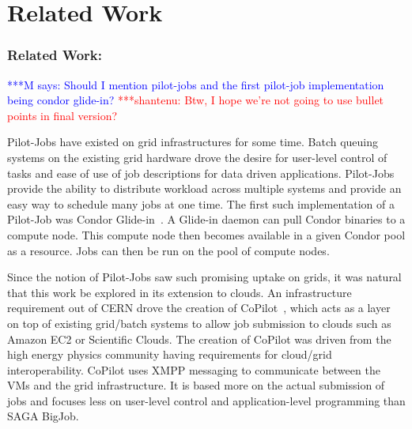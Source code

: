 \documentclass[times]{cpeauth}
\newcommand{\jhanote}[1]{ {\textcolor{red} { ***shantenu: #1 }}}
\newcommand{\mrnote}[1]{ {\textcolor{blue} { ***M says: #1 }}}
\newcommand{\pmnote}[1]{ {\textcolor{blue} { ***Pradeep: #1 }}}
\newcommand{\note}[1]{ {\textcolor{magenta} { ***Note: #1 }}}
\newcommand{\mrnote}[1]{}
\newcommand{\pmnote}[1]{}
\newcommand{\jhanote}[1]{}
\newcommand{\note}[1]{}
\newcommand{\pilotjob}{Pilot-Job\xspace}
\newcommand{\pilotjobs}{Pilot-Jobs\xspace}
\begin{document}






\section{Related Work}


\subsubsection*{Related Work:} 


\mrnote{Should I mention pilot-jobs and the first pilot-job implementation being condor glide-in?}
\jhanote{Btw, I hope we're not going to use bullet points in final version?}

\pilotjobs have existed on grid infrastructures for some time. Batch queuing
systems on the existing grid hardware drove the desire for user-level control
of tasks and ease of use of job descriptions for data driven applications.
\pilotjobs provide the ability to distribute workload across multiple systems
and provide an easy way to schedule many jobs at one time. The first such
implementation of a \pilotjob was Condor Glide-in~\cite{glidein}. A Glide-in
daemon can pull Condor binaries to a compute node. This compute node then
becomes available in a given Condor pool as a resource. Jobs can then be run
on the pool of compute nodes.

Since the notion of \pilotjobs saw such promising uptake on grids, it
was natural that this work be explored in its extension to clouds. An
infrastructure requirement out of CERN drove the creation of
CoPilot~\cite{copilot-tr}, which acts as a layer on top of existing
grid/batch systems to allow job submission to clouds such as Amazon
EC2 or Scientific Clouds. The creation of CoPilot was driven from the
high energy physics community having requirements for cloud/grid
interoperability. CoPilot uses XMPP messaging to communicate between
the VMs and the grid infrastructure. It is based more on the actual
submission of jobs and focuses less on user-level control and
application-level programming than SAGA BigJob.
\end{document}
